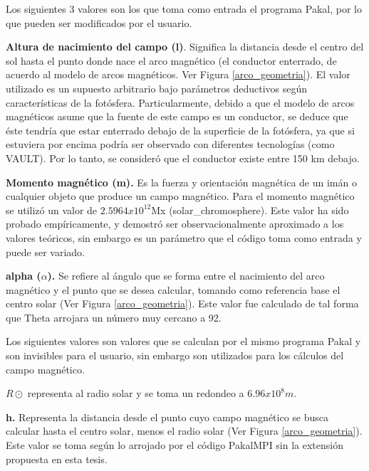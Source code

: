 \documentclass[9pt]{book}
\begin{document}
Los siguientes 3 valores son los que toma como entrada el programa Pakal, por lo que pueden ser modificados por el usuario.

\textbf{Altura de nacimiento del campo (l)}. Significa la distancia desde el centro del sol hasta el punto donde nace el arco magn\'etico (el conductor enterrado, de acuerdo al modelo de arcos magn\'eticos. Ver Figura \ref{arco_geometria}). El valor utilizado es un supuesto arbitrario bajo par\'ametros deductivos seg\'un caracter\'isticas de la fot\'osfera. Particularmente, debido a que el modelo de arcos magn\'eticos asume que la fuente de este campo es un conductor, se deduce que \'este tendr\'ia que estar enterrado debajo de la superficie de la fot\'osfera, ya que si estuviera por encima podr\'ia ser observado con diferentes tecnolog\'ias (como VAULT). Por lo tanto, se consider\'o que el conductor existe entre 150 km debajo.

\textbf{Momento magn\'etico (m).} Es la fuerza y orientaci\'on magn\'etica de un im\'an o cualquier objeto que produce un campo magn\'etico. Para el momento magn\'etico se utiliz\'o un valor de $2.5964x10^{12}$Mx (solar\_chromosphere). Este valor ha sido probado emp\'iricamente, y demostr\'o ser observacionalmente aproximado a los valores te\'oricos, sin embargo es un par\'ametro que el c\'odigo toma como entrada y puede ser variado.

\textbf{alpha ($\alpha$).} Se refiere al \'angulo que se forma entre el nacimiento del arco magn\'etico y el punto que se desea calcular, tomando como referencia base el centro solar (Ver Figura \ref{arco_geometria}). Este valor fue calculado de tal forma que Theta arrojara un n\'umero muy cercano a 92\degree.

Los siguientes valores son valores que se calculan por el mismo programa Pakal y son invisibles para el usuario, sin embargo son utilizados para los c\'alculos del campo magn\'etico.


\textbf{\(R\odot\)}  representa al radio solar y se toma un redondeo a $6.96x10^8m$.

\textbf{h.} Representa la distancia desde el punto cuyo campo magn\'etico se busca calcular hasta el centro solar, menos el radio solar (Ver Figura \ref{arco_geometria}). Este valor se toma seg\'un lo arrojado por el c\'odigo PakalMPI sin la extensi\'on propuesta en esta tesis.
\end{document}
